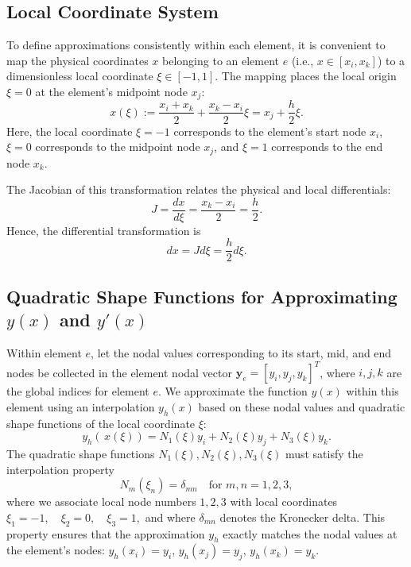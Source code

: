 \documentclass[12pt]{article}
\begin{document}
    
\subsection{Local Coordinate System}
    
    To define approximations consistently within each element, it is convenient to map the physical coordinates \( x \) belonging to an element \(e\) (i.e., \(x \in [x_i, x_k]\)) to a dimensionless local coordinate \( \xi \in \left[-1,1\right] \). The mapping places the local origin \( \xi = 0 \) at the element's midpoint node \( x_j \):
    \[
        x(\xi) := \frac{x_{i} + x_k}{2} + \frac{x_k - x_{i}}{2} \xi =  x_j + \frac{h}{2} \xi.
    \]
    Here, the local coordinate \( \xi = -1 \) corresponds to the element's start node \( x_{i} \), \( \xi = 0 \) corresponds to the midpoint node \( x_j \), and \( \xi = 1 \) corresponds to the end node \( x_k \).
    
    The Jacobian of this transformation relates the physical and local differentials:
    \[ J = \frac{dx}{d\xi} = \frac{x_k - x_i}{2} = \frac{h}{2}. \]
    Hence, the differential transformation is
    \[
        dx = J d\xi = \frac{h}{2} d\xi.
    \]
    
    
\subsection{Quadratic Shape Functions for Approximating \( y(x) \) and \( y'(x) \) }
    
    Within element \(e\), let the nodal values corresponding to its start, mid, and end nodes be collected in the element nodal vector \( \mathbf{y}_{e} = \left[y_{i}, y_{j}, y_k\right]^{T}\), where \(i, j, k\) are the global indices for element \(e\). We approximate the function \( y(x) \) within this element using an interpolation \( y_h (x) \) based on these nodal values and quadratic shape functions of the local coordinate \( \xi \):
    \[
        y_h \left(\,x(\xi) \right) =  N_{1}(\xi) y_{i} + N_{2}(\xi) y_{j} + N_{3}(\xi) y_k.
    \]
    The quadratic shape functions \( N_1(\xi), N_2(\xi), N_3(\xi) \) must satisfy the interpolation property
    \[
        N_m(\xi_n) = \delta_{mn} \quad \text{for } m, n = 1, 2, 3,
    \]
    where we associate local node numbers $1, 2, 3$ with local coordinates
    \( \xi_1 = -1, \quad \xi_2 = 0, \quad \xi_3 = 1, \)
    and where \(\delta_{mn}\) denotes the Kronecker delta. This property ensures that the approximation \(y_h\) exactly matches the nodal values at the element's nodes: \( y_h(x_i) = y_i\), \( y_h(x_j) = y_j\), \( y_h(x_k) = y_k \).
    
\end{document}
